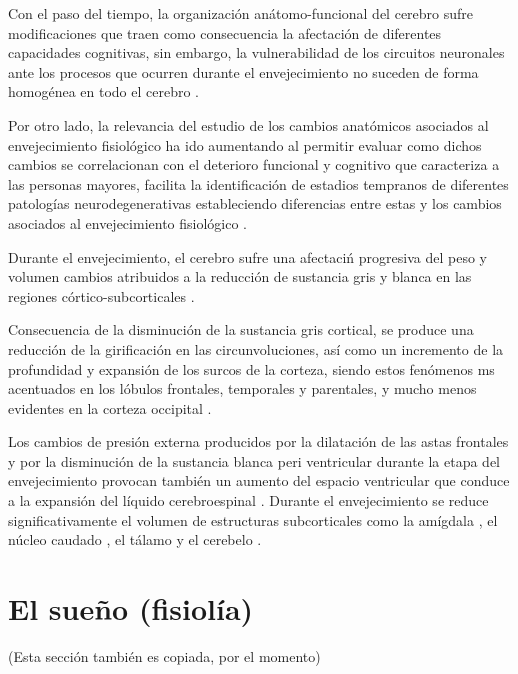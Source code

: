 \documentclass[12pt,a4paper]{mitthesis}
\begin{document}
Con el paso del tiempo, la organizaci\'on an\'atomo-funcional del cerebro sufre modificaciones 
que traen como consecuencia la afectaci\'on de diferentes capacidades cognitivas, sin embargo, 
la vulnerabilidad de los circuitos neuronales ante los procesos que ocurren durante el 
envejecimiento no suceden de forma homogénea en todo el cerebro \cite{Hita14}.

Por otro lado, la relevancia del estudio de los cambios anat\'omicos asociados al envejecimiento 
fisiol\'ogico ha ido aumentando al permitir evaluar como dichos cambios se correlacionan con 
el deterioro funcional y cognitivo que caracteriza a las personas mayores, facilita la 
identificaci\'on de estadios tempranos de diferentes patolog\'ias neurodegenerativas estableciendo 
diferencias entre estas y los cambios asociados al envejecimiento fisiol\'ogico \cite{Hita14}.

Durante el envejecimiento, el cerebro sufre una afectaci\'n progresiva del peso \cite{Dekaban78} 
y volumen \cite{Hubbard81} cambios atribuidos a la reducci\'on de sustancia gris y blanca en
las regiones c\'ortico-subcorticales \cite{Hita14}.

Consecuencia de la disminuci\'on de la sustancia gris cortical, se produce una reducci\'on de 
la girificaci\'on en las circunvoluciones, as\'i como un incremento de la profundidad y 
expansi\'on de los surcos de la corteza, siendo estos fen\'omenos ms acentuados en los l\'obulos 
frontales, temporales y parentales, y mucho menos evidentes en la corteza occipital \cite{Raz05}.

Los cambios de presi\'on externa producidos por la dilataci\'on de las astas frontales y por la 
disminuci\'on de la sustancia blanca peri ventricular durante la etapa del envejecimiento 
provocan tambi\'en un aumento del espacio ventricular que conduce a la expansi\'on del l\'iquido 
cerebroespinal \cite{Hita14,Raz05}.
Durante el envejecimiento se reduce significativamente el volumen de estructuras subcorticales 
como la am\'igdala \cite{Allen05}, el n\'ucleo caudado \cite{Raz05}, el t\'alamo 
\cite{CarrilloMora} y el cerebelo \cite{Hita14}.


\section{El sue\~no (fisiol\'ia)}

(Esta secci\'on tambi\'en es copiada, por el momento)
\end{document}
